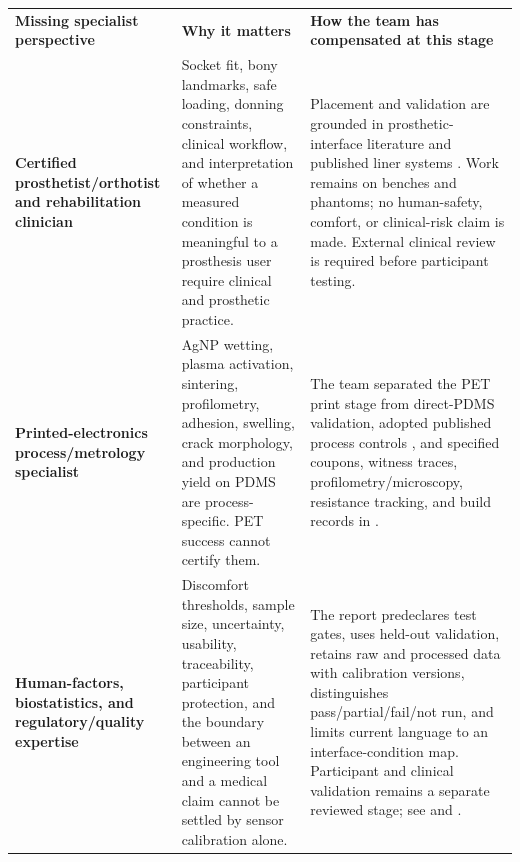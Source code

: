 \vspace{0.65em}

\begingroup
\fontsize{7.3}{8.55}\selectfont
\setlength{\tabcolsep}{2.35pt}\renewcommand{\arraystretch}{1.065}
\begin{tabularx}{\linewidth}{>{\raggedright\arraybackslash\bfseries\color{AUBRed}}p{2.75cm}Y Y}
\color{white}\textbf{Missing specialist perspective} &
\color{white}\textbf{Why it matters} &
\color{white}\textbf{How the team has compensated at this stage} \\
Certified prosthetist/orthotist and rehabilitation clinician &
Socket fit, bony landmarks, safe loading, donning constraints, clinical
workflow, and interpretation of whether a measured condition is meaningful to
a prosthesis user require clinical and prosthetic practice. &
Placement and validation are grounded in prosthetic-interface literature and
published liner systems \cite{paterno2020,q3kwak2020,q3tang2022}. Work remains
on benches and phantoms; no human-safety, comfort, or clinical-risk claim is
made. External clinical review is required before participant testing. \\
Printed-electronics process/metrology specialist &
AgNP wetting, plasma activation, sintering, profilometry, adhesion, swelling,
crack morphology, and production yield on PDMS are process-specific. PET
success cannot certify them. &
The team separated the PET print stage from direct-PDMS validation, adopted
published process controls \cite{albrecht2018stretch,sun2016,
q4abukhalaf2018,q4abukhalaf2019}, and specified coupons, witness traces,
profilometry/microscopy, resistance tracking, and build records in
. \\
Human-factors, biostatistics, and regulatory/quality expertise &
Discomfort thresholds, sample size, uncertainty, usability, traceability,
participant protection, and the boundary between an engineering tool and a
medical claim cannot be settled by sensor calibration alone. &
The report predeclares test gates, uses held-out validation, retains raw and
processed data with calibration versions, distinguishes pass/partial/fail/not
run, and limits current language to an interface-condition map. Participant
and clinical validation remains a separate reviewed stage; see
 and
. \\
\end{tabularx}
\endgroup

